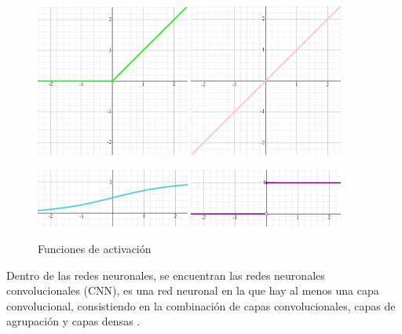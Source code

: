     \begin{figure}[!ht]
         \centering
         \includegraphics[width=0.45\textwidth]{img/RELU.png}
         \includegraphics[width=0.45\textwidth]{img/lineal.png}

         \hfill \break
         \centering
         \includegraphics[width=0.45\textwidth]{img/Sigmoidal.png}
         \includegraphics[width=0.45\textwidth]{img/escalon.png}
         
         \caption{Funciones de activación}
         \label{fig:funciones de activacion}
    \end{figure}

     Dentro de las redes neuronales, se encuentran las redes neuronales convolucionales (CNN), es una red neuronal en la que hay al menos una capa convolucional, consistiendo en la combinación de capas convolucionales, capas de agrupación y capas densas \cite{definicion_CNN}.

